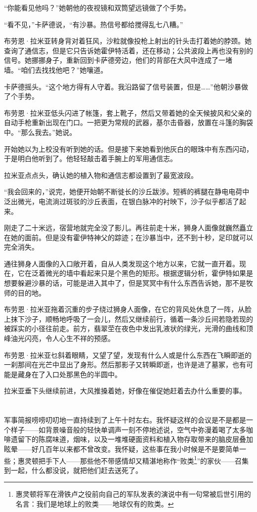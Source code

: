 \documentclass[AutoFakeBold=true]{book}
\begin{document}
``你能看见他吗？''她朝他的夜视镜和双筒望远镜做了个手势。

``看不见，''卡萨德说，``有沙暴。热信号都给搅得乱七八糟。''

布劳恩·拉米亚转身背对着狂风，沙粒就像投枪上射出的针头击打着她的脖颈。她查询了通信志，但是它只告诉她霍伊特活着，还在移动；公共波段上再也没有别的信号。她挪挪身子，重新回到卡萨德旁边，他们的背部在大风中连成了一堵墙。``咱们去找找他吧？''她嚷道。

卡萨德摇头。``这个地方得有人守着。我沿路留了信号装置，但是……''他朝沙暴做了个手势。

布劳恩·拉米亚低头闪进了帐篷，套上靴子，然后又带着她的全天候披风和父亲的自动手枪重新出现在门口。一把更为常规的武器，基尔击昏器，放置在斗篷的胸袋中。``那么我去。''她说。

开始她以为上校没有听到她的话。但是接下来她看到他灰白的眼珠中有东西闪动，于是明白他听到了。他轻轻敲击着手腕上的军用通信志。

拉米亚点点头，确认她的植入物和通信志都设置到了最宽波段。

``我会回来的，''说完，她便开始朝不断徙长的沙丘跋涉。短裤的裤腿在静电电荷中泛出微光，电流淌过斑驳的沙丘表面，在银白脉冲的衬映下，沙子似乎都活了起来。

刚走了二十米远，宿营地就完全没了影儿。再往前走十米，狮身人面像就巍然矗立在她的面前。但是没有霍伊特神父的踪迹；在沙暴当中，还不到十秒，足印就可以完全消失。

通往狮身人面像的入口敞开着，自从人类发现这个地方以来，它就一直开着。现在，它在泛着微光的墙中看起来只是个黑色的矩形。根据逻辑分析，霍伊特如果是想要躲避沙暴的话，可能是进入其中了，但是冥冥中有什么东西告诉她，那不是牧师的目的地。

布劳恩·拉米亚拖着沉重的步子绕过狮身人面像，在它的背风处休息了一阵，从脸上抹下沙子，顺畅地呼吸了一会儿，然后又继续前行，循着一条沙丘间若隐若现的被踩实的小径往前走。前方，翡翠茔在夜色中发出乳液状的绿光，光滑的曲线和顶峰油光闪亮，令人心生不祥的预感。

布劳恩·拉米亚乜斜着眼睛，又望了望，发现有什么人或是什么东西在飞瞬即逝的一刹那间在光芒中显出了身形。然后那影子又转瞬即逝，也许是进了墓冢，也有可能是藏身在了入口处那黑色的半圆中。

拉米亚垂下头继续前进，大风推搡着她，好像在催促她赶着去办什么重要的事。

\chapter{}

军事简报唠唠叨叨地一直持续到了上午十时左右。我怀疑这样的会议是不是都是一个样子——如背景噪音般的轻快单调声一刻不停地述说，空气中弥漫着喝了太多咖啡遗留下的陈腐味道，烟味，以及一堆堆硬面资料和植入物存取带来的脑皮层叠加眩晕——好几百年以来都不曾改变。我怀疑，这些事在我小时候是不是要简单一些；惠灵顿把手下人——那些他不带感情却又精湛地称作``败类\footnote{惠灵顿将军在滑铁卢之役前向自己的军队发表的演说中有一句常被后世引用的名言：我们是地球上的败类——地球仅有的败类。}''的家伙——召集到一起，什么都没说，就把他们赶去送死了。
\end{document}
